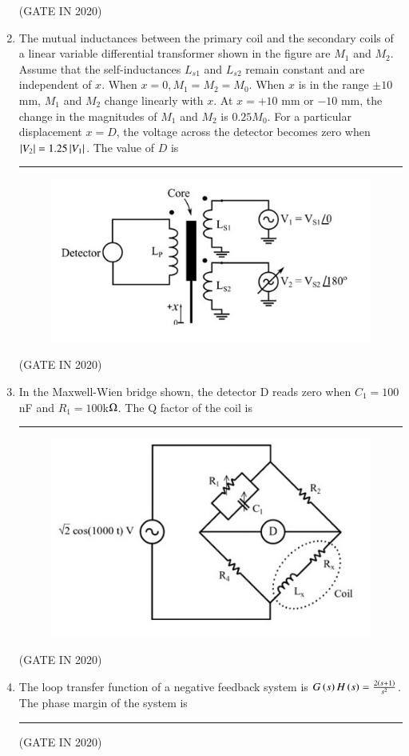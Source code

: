 \documentclass[journal,12pt,onecolumn]{IEEEtran}
\theoremstyle{remark}
\begin{document}
\begin{enumerate}
\hfill{(GATE IN 2020)}

\item The mutual inductances between the primary coil and the secondary coils of a linear variable differential transformer  shown in the figure are $M_1$ and $M_2$. Assume that the self-inductances $L_{s1}$ and $L_{s2}$ remain constant and are independent of $x$. When $x = 0, M_1 = M_2 = M_0$. When $x$ is in the range $\pm 10$ mm, $M_1$ and $M_2$ change linearly with $x$. At $x = +10$ mm or $-10$ mm, the change in the magnitudes of $M_1$ and $M_2$ is $0.25 M_0$. For a particular displacement $x = D$, the voltage across the detector becomes zero when $\left\vert V_2\right\vert = 1.25\left\vert V_1\right\vert$. The value of $D$  is \rule{2cm}{0.4pt}
\begin{figure}[H]
\centering
\includegraphics[width=0.5\columnwidth]{figs/q25.jpg}
\caption*{}
\label{fig:q25}
\end{figure}

\hfill{(GATE IN 2020)}

\item In the Maxwell-Wien bridge shown, the detector D reads zero when $C_1 = 100$ nF and $R_1 = 100$k$\ohm$. The Q factor of the coil is \rule{2cm}{0.4pt}
\begin{figure}[H]
\centering
\includegraphics[width=0.5\columnwidth]{figs/q26.jpg}
\caption*{}
\label{fig:q26}
\end{figure}

\hfill{(GATE IN 2020)}

\item The loop transfer function of a negative feedback system is $G\left(s\right)H\left(s\right) = \frac{2\left(s+1\right)}{s^2}$. The phase margin of the system  is \rule{2cm}{0.4pt}

\hfill{(GATE IN 2020)}

\end{enumerate}
\end{document}
